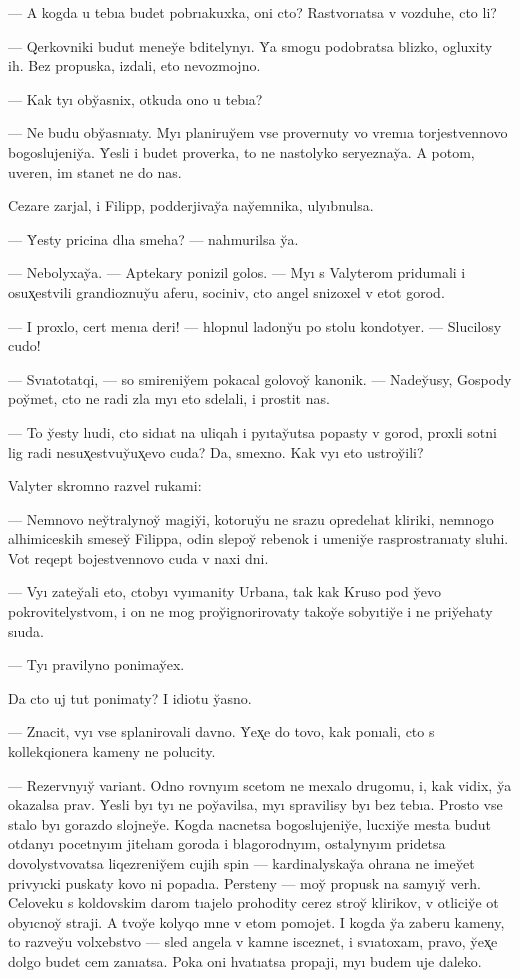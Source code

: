 \documentclass[10pt]{book}
\begin{document}
— A kogda u tebıa budet pobrıakuxka, oni cto? Rastvorıatsa v vozduhe, cto li?

— Qerkovniki budut meney̆e bditelynyı. Y̆a smogu podobratsa blizko, ogluxity ih. Bez propuska, izdali, eto nevozmojno.

— Kak tyı oby̆asnix, otkuda ono u tebıa?

— Ne budu oby̆asnıaty. Myı planiruy̆em vse provernuty vo vremıa torjestvennovo bogoslujeniy̆a. Y̆esli i budet proverka, to ne nastolyko seryeznay̆a. A potom, uveren, im stanet ne do nas.

Cezare zarjal, i Filipp, podderjivay̆a nay̆emnika, ulyıbnulsa.

— Y̆esty pricina dlıa smeha? — nahmurilsa y̆a.

— Nebolyxay̆a. — Aptekary ponizil golos. — Myı s Valyterom pridumali i osux̨estvili grandioznuy̆u aferu, sociniv, cto angel snizoxel v etot gorod.

— I proxlo, cert menıa deri! — hlopnul ladony̆u po stolu kondotyer. — Slucilosy cudo!

— Svıatotatqi, — so smireniy̆em pokacal golovoy̆ kanonik. — Nadey̆usy, Gospody poy̆met, cto ne radi zla myı eto sdelali, i prostit nas.

— To y̆esty lıudi, cto sidıat na uliqah i pyıtay̆utsa popasty v gorod, proxli sotni lig radi nesux̨estvuy̆ux̨evo cuda? Da, smexno. Kak vyı eto ustroy̆ili?

Valyter skromno razvel rukami:

— Nemnovo ney̆tralynoy̆ magiy̆i, kotoruy̆u ne srazu opredelıat kliriki, nemnogo alhimiceskih smesey̆ Filippa, odin slepoy̆ rebenok i umeniy̆e rasprostranıaty sluhi. Vot reqept bojestvennovo cuda v naxi dni.

— Vyı zatey̆ali eto, ctobyı vyımanity Urbana, tak kak Kruso pod y̆evo pokrovitelystvom, i on ne mog proy̆ignorirovaty takoy̆e sobyıtiy̆e i ne priy̆ehaty sıuda.

— Tyı pravilyno ponimay̆ex.

Da cto uj tut ponimaty? I idiotu y̆asno.

— Znacit, vyı vse splanirovali davno. Y̆ex̨e do tovo, kak ponıali, cto s kollekqionera kameny ne polucity.

— Rezervnyıy̆ variant. Odno rovnyım scetom ne mexalo drugomu, i, kak vidix, y̆a okazalsa prav. Y̆esli byı tyı ne poy̆avilsa, myı spravilisy byı bez tebıa. Prosto vse stalo byı gorazdo slojney̆e. Kogda nacnetsa bogoslujeniy̆e, lucxiy̆e mesta budut otdanyı pocetnyım jitelıam goroda i blagorodnyım, ostalynyım pridetsa dovolystvovatsa liqezreniy̆em cujih spin — kardinalyskay̆a ohrana ne imey̆et privyıcki puskaty kovo ni popadıa. Persteny — moy̆ propusk na samyıy̆ verh. Celoveku s koldovskim darom tıajelo prohodity cerez stroy̆ klirikov, v otliciy̆e ot obyıcnoy̆ straji. A tvoy̆e kolyqo mne v etom pomojet. I kogda y̆a zaberu kameny, to razvey̆u volxebstvo — sled angela v kamne isceznet, i svıatoxam, pravo, y̆ex̨e dolgo budet cem zanıatsa. Poka oni hvatıatsa propaji, myı budem uje daleko.
\end{document}
